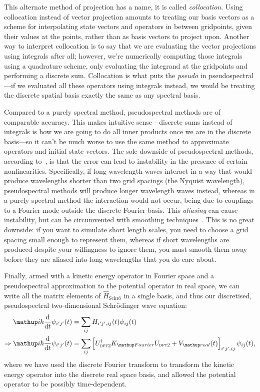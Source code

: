 This alternate method of projection has a name, it is called \emph{collocation}\cite[p.~227]{tannor_introduction_2007}. Using collocation instead of vector projection amounts to treating our basis vectors as a scheme for interpolating state vectors and operators in between gridpoints, given their values at the points, rather than as basis vectors to project upon. Another way to interpret collocation is to say that we are evaluating the vector projections using integrals after all; however, we're numerically computing those integrals using a quadrature scheme, only evaluating the integrand at the gridpoints and performing a discrete sum\cite[p.~283]{tannor_introduction_2007}. Collocation is what puts the \emph{pseudo} in pseudospectral---if we evaluated all these operators using integrals instead, we would be treating the discrete spatial basis exactly the same as any spectral basis. 

Compared to a purely spectral method, pseudospectral methods are of comparable accuracy\cite{orszag_comparison_1972}. This makes intuitive sense---discrete sums instead of integrals is how we are going to do all inner products once we are in the discrete basis---so it can't be much worse to use the same method to approximate operators and initial state vectors. The sole downside of pseudospectral methods, according to~\cite{orszag_comparison_1972}, is that the error can lead to instability in the presence of certain nonlinearities. Specifically, if long wavelength waves interact in a way that would produce wavelengths shorter than two grid spacings (the Nyquist wavelength), pseudospectral methods will produce longer wavelength waves instead, whereas in a purely spectral method the interaction would not occur, being due to couplings to a Fourier mode outside the discrete Fourier basis. This \emph{aliasing} can cause instability, but can be circumvented with smoothing techniques~\cite{phillips_example_1959}. This is no great downside: if you want to simulate short length scales, you need to choose a grid spacing small enough to represent them, whereas if short wavelengths are produced despite your willingness to ignore them, you must smooth them away before they are aliased into long wavelengths that you do care about.

Finally, armed with a kinetic energy operator in Fourier space and a pseudospectral approximation to the potential operator in real space, we can write all the matrix elements of $\hat H_\textrm{Schr\"o}$ in a single basis, and thus our discretised, pseudospectral two-dimensional Schr\"odinger wave equation:
\begin{align}
\ii\hbar\dv{t}\psi_{i^\prime j^\prime}(t) &= \sum_{ij} H_{i^\prime j^\prime, ij}(t) \psi_{ij}(t)\\
\Rightarrow \ii\hbar\dv{t}\psi_{i^\prime j^\prime}(t) &=\sum_{ij}
\left[
U^\dagger_{\textsc{dft2}}K_\up{Fourier}U_{\textsc{dft2}}
 + V_\up{real}(t)
\right]_{i^\prime j^\prime, ij}\psi_{ij}(t),
\end{align}
where we have used the discrete Fourier transform to transform the kinetic energy operator into the discrete real space basis, and allowed the potential operator to be possibly time-dependent.

